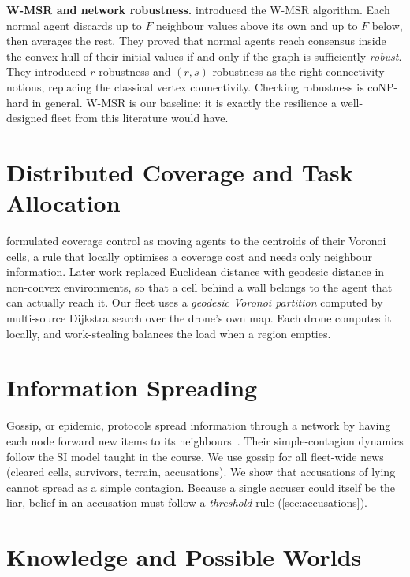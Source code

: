 \textbf{W-MSR and network robustness.} \citet{LeBlanc2013} introduced the W-MSR algorithm. Each normal agent discards up
to $F$ neighbour values above its own and up to $F$ below, then averages the rest. They proved that normal agents reach
consensus inside the convex hull of their initial values if and only if the graph is sufficiently \emph{robust}. They
introduced $r$-robustness and $(r,s)$-robustness as the right connectivity notions, replacing the classical vertex
connectivity. Checking robustness is coNP-hard in general. W-MSR is our
\naive{} baseline: it is exactly the resilience a well-designed fleet from this literature would have.

\section{Distributed Coverage and Task Allocation}

\citet{Cortes2004} formulated coverage control as moving agents to the centroids of their Voronoi cells, a rule that
locally optimises a coverage cost and needs only neighbour information. Later work replaced Euclidean distance with
geodesic distance in non-convex environments, so that a cell behind a wall belongs to the agent that can actually
reach it. Our fleet uses a \emph{geodesic Voronoi partition} computed by multi-source Dijkstra search
over the drone's own map. Each drone computes it locally, and work-stealing balances the load when a region empties.

\section{Information Spreading}

Gossip, or epidemic, protocols spread information through a network by having each node forward new items to its
neighbours~\citep{Demers1987}. Their simple-contagion dynamics follow the SI model taught in the course. We use gossip for
all fleet-wide news (cleared cells, survivors, terrain, accusations). We show that accusations of lying cannot spread
as a simple contagion. Because a single accuser could itself be the liar, belief in an accusation must follow a
\emph{threshold} rule (\autoref{sec:accusations}).

\section{Knowledge and Possible Worlds}
\label{sec:lit-epistemic}

